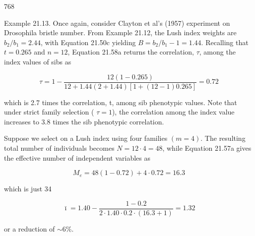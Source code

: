 \documentclass{article}
\begin{document}
768

Example 21.13. Once again, consider Clayton et al's (1957) experiment on Drosophila bristle number. From Example 21.12, the Lush index weights are  $ b_2/b_1 = 2.44 $, with Equation 21.50c yielding  $ B = b_2/b_1 - 1 = 1.44 $. Recalling that  $ t = 0.265 $ and  $ n = 12 $, Equation 21.58a returns the correlation,  $ \tau $, among the index values of sibs as

\begin{equation}
\tau=1-\frac{12\left(1-0.265\right)}{12+1.44(2+1.44)[1+(12-1)0.265]}=0.72
\end{equation}

which is 2.7 times the correlation, t, among sib phenotypic values. Note that under strict family selection ( $ \tau = 1 $), the correlation among the index value increases to 3.8 times the sib phenotypic correlation.

Suppose we select on a Lush index using four families  $ (m = 4) $. The resulting total number of individuals becomes  $ N = 12 \cdot 4 = 48 $, while Equation 21.57a gives the effective number of independent variables as

\begin{equation}
M_{e}=48(1-0.72)+4\cdot0.72=16.3
\end{equation}

which is just 34%

\begin{equation}
\bar{\imath}=1.40-\frac{1-0.2}{2\cdot1.40\cdot0.2\cdot(16.3+1)}=1.32
\end{equation}

or a reduction of  $ \sim6\% $.
\end{document}
